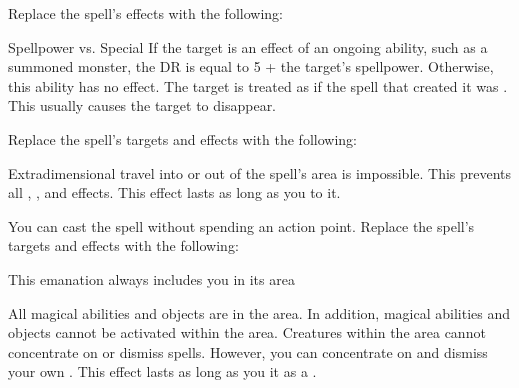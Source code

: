 Replace the spell's effects with the following:
\begin{spellcontent}
\begin{augmenteffects}
\begin{spellattack}{Spellpower vs. Special}
\spellspecial
If the target is an effect of an ongoing  ability, such as a summoned monster, the DR is equal to 5 + the target's spellpower.
Otherwise, this ability has no effect.
\spellsuccess
The target is treated as if the spell that created it was .
This usually causes the target to disappear.
\end{spellattack}
\end{augmenteffects}
\end{spellcontent}
Replace the spell's targets and effects with the following:
\begin{spellcontent}
\begin{augmenttargetinginfo}
\end{augmenttargetinginfo}
\begin{augmenteffects}
\spelleffect
Extradimensional travel into or out of the spell's area is impossible.
This prevents all , , and  effects.
This effect lasts as long as you  to it.
\end{augmenteffects}
\end{spellcontent}
You can cast the spell without spending an action point.
Replace the spell's targets and effects with the following:
\begin{spellcontent}
\begin{augmenttargetinginfo}
\spellspecial This emanation always includes you in its area
\end{augmenttargetinginfo}
\begin{augmenteffects}
\spelleffect
All magical abilities and objects are  in the area.
In addition, magical abilities and objects cannot be activated within the area.
Creatures within the area cannot concentrate on or dismiss spells.
However, you can concentrate on and dismiss your own .
This effect lasts as long as you  it as a .
\end{augmenteffects}
\end{spellcontent}
